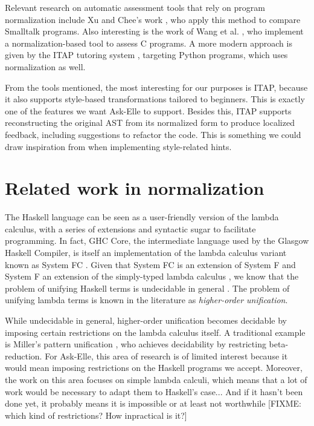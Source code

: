 Relevant research on automatic assessment tools that rely on program normalization include Xu and Chee's work \cite{2003transformation}, who apply this method to compare Smalltalk programs. Also interesting is the work of Wang et al. \cite{2007wang}, who implement a normalization-based tool to assess C programs. A more modern approach is given by the ITAP tutoring system \cite{2017ITAP}, targeting Python programs, which uses normalization as well.

From the tools mentioned, the most interesting for our purposes is ITAP, because it also supports style-based transformations tailored to beginners. This is exactly one of the features we want Ask-Elle to support. Besides this, ITAP supports reconstructing the original AST from its normalized form to produce localized feedback, including suggestions to refactor the code. This is something we could draw inspiration from when implementing style-related hints.

\section{Related work in normalization}

The Haskell language can be seen as a user-friendly version of the lambda calculus, with a series of extensions and syntactic sugar to facilitate programming. In fact, GHC Core, the intermediate language used by the Glasgow Haskell Compiler, is itself an implementation of the lambda calculus variant known as System FC \cite{2007systemfc}. Given that System FC is an extension of System F \cite{2007systemfc} and System F an extension of the simply-typed lambda calculus \cite{2002pierce}, we know that the problem of unifying Haskell terms is undecidable in general \cite{2013barendregt}. The problem of unifying lambda terms is known in the literature as \emph{higher-order unification}.

While undecidable in general, higher-order unification becomes decidable by imposing certain restrictions on the lambda calculus itself. A traditional example is Miller's pattern unification \cite{1991miller}, who achieves decidability by restricting beta-reduction. For Ask-Elle, this area of research is of limited interest because it would mean imposing restrictions on the Haskell programs we accept. Moreover, the work on this area focuses on simple lambda calculi, which means that a lot of work would be necessary to adapt them to Haskell's case... And if it hasn't been done yet, it probably means it is impossible or at least not worthwhile [FIXME: which kind of restrictions? How inpractical is it?]

